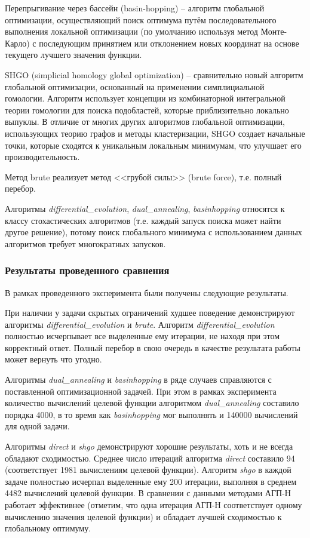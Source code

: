 \documentclass[a4paper,12pt,russian]{article}
\begin{document}
Перепрыгивание через бассейн (basin-hopping) -- алгоритм глобальной оптимизации, осуществляющий поиск оптимума путём последовательного выполнения локальной оптимизации (по умолчанию используя метод Монте-Карло) с последующим принятием или отклонением новых координат на основе текущего лучшего значения функции.

SHGO (simplicial homology global optimization) -- сравнительно новый алгоритм глобальной оптимизации, основанный на применении симплициальной гомологии. Алгоритм использует концепции из комбинаторной интегральной теории гомологии для поиска подобластей, которые приблизительно локально выпуклы. В отличие от многих других алгоритмов глобальной оптимизации, использующих теорию графов и методы кластеризации, SHGO создает начальные точки, которые сходятся к уникальным локальным минимумам, что улучшает его производительность.

Метод brute реализует метод <<грубой силы>> (brute force), т.е. полный перебор.

Алгоритмы \textit{differential\_evolution}, \textit{dual\_annealing}, \textit{basinhopping} относятся к классу стохастических алгоритмов (т.е. каждый запуск поиска может найти другое решение), потому поиск глобального минимума с использованием данных алгоритмов требует многократных запусков.

\subsubsection{Результаты проведенного сравнения}

В рамках проведенного эксперимента были получены следующие результаты.

При наличии у задачи скрытых ограничений худшее поведение демонстрируют алгоритмы \textit{differential\_evolution} и \textit{brute}. Алгоритм \textit{differential\_evolution} полностью исчерпывает все выделенные ему итерации, не находя при этом корректный ответ. Полный перебор в свою очередь в качестве результата работы может вернуть что угодно. 

Алгоритмы \textit{dual\_annealing} и \textit{basinhopping} в ряде случаев справляются с поставленной оптимизационной задачей. При этом в рамках эксперимента количество вычислений целевой функции алгоритмом \textit{dual\_annealing} составило порядка 4000, в то время как \textit{basinhopping} мог выполнять и 140000 вычислений для одной задачи.

Алгоритмы \textit{direct} и \textit{shgo} демонстрируют хорошие результаты, хоть и не всегда обладают сходимостью. Среднее число итераций алгоритма \textit{direct} составило 94 (соответствует 1981 вычислениям целевой функции). Алгоритм \textit{shgo} в каждой задаче полностью исчерпал выделенные ему 200 итерации, выполняя в среднем 4482 вычислений целевой функции. В сравнении с данными методами АГП-Н работает эффективнее (отметим, что одна итерация АГП-Н соответствует одному вычислению значения целевой функции) и обладает лучшей сходимостью к глобальному оптимуму.
\end{document}
